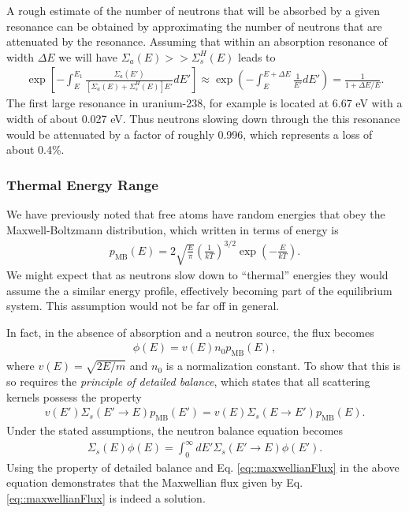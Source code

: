 \documentclass[11pt]{article}
\begin{document}
A rough estimate of the number of neutrons that will be absorbed by a given resonance can be obtained by approximating the number of neutrons that are attenuated by the resonance.  Assuming that within an absorption resonance of width \(\Delta E\) we will have \(\Sigma_a(E) >> \Sigma_s^H(E)\) leads to
\begin{align}
  \exp\left[ -\int_E^{E_1} \frac{\Sigma_a(E')}{\left[ \Sigma_a(E) + \Sigma_s^H(E) \right] E'} dE' \right]
  \approx \exp\left( -\int_E^{E+\Delta E} \frac{1}{E'} dE' \right)
  = \frac{1}{1+\Delta E/E}.
\end{align}
The first large resonance in uranium-238, for example is located at 6.67 eV with a width of about 0.027 eV.  Thus neutrons slowing down through the this resonance would be attenuated by a factor of roughly 0.996, which represents a loss of about 0.4\%.

\subsubsection{Thermal Energy Range}
\label{sec:orgheadline29}
We have previously noted that free atoms have random energies that obey the Maxwell-Boltzmann distribution, which written in terms of energy is
\begin{align}
  p_\text{MB}(E) = 2 \sqrt{\frac{E}{\pi}} \left( \frac{1}{kT} \right)^{3/2} \exp\left( - \frac{E}{kT} \right).
\end{align}
We might expect that as neutrons slow down to ``thermal'' energies they would assume the a similar energy profile, effectively becoming part of the equilibrium system.  This assumption would not be far off in general.

In fact, in the absence of absorption and a neutron source, the flux becomes
\begin{align}
  \label{eq::maxwellianFlux}
  \phi(E) = v(E) n_0 p_\text{MB}(E),
\end{align}
where \(v(E) = \sqrt{2E/m}\) and \(n_0\) is a normalization constant.  To show that this is so requires the \emph{principle of detailed balance}, which states that all scattering kernels possess the property
\begin{align}
  v(E') \Sigma_s(E' \rightarrow E) p_\text{MB}(E') = v(E) \Sigma_s(E \rightarrow E') p_\text{MB}(E).
\end{align}
Under the stated assumptions, the neutron balance equation becomes
\begin{align}
  \Sigma_s(E) \phi(E) = \int_0^\infty dE' \Sigma_s(E' \rightarrow E ) \phi(E').
\end{align}
Using the property of detailed balance and Eq. \eqref{eq::maxwellianFlux} in the above equation demonstrates that the Maxwellian flux given by Eq. \eqref{eq::maxwellianFlux} is indeed a solution.
\end{document}

